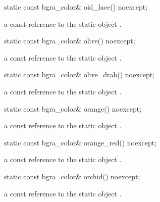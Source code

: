 \begin{itemdecl}
static const bgra_color& old_lace() noexcept;
\end{itemdecl}
\begin{itemdescr}
\pnum
\returns
a const reference to the static  object .
\end{itemdescr}

\begin{itemdecl}
static const bgra_color& olive() noexcept;
\end{itemdecl}
\begin{itemdescr}
\pnum
\returns
a const reference to the static  object .
\end{itemdescr}

\begin{itemdecl}
static const bgra_color& olive_drab() noexcept;
\end{itemdecl}
\begin{itemdescr}
\pnum
\returns
a const reference to the static  object .
\end{itemdescr}

\begin{itemdecl}
static const bgra_color& orange() noexcept;
\end{itemdecl}
\begin{itemdescr}
\pnum
\returns
a const reference to the static  object .
\end{itemdescr}

\begin{itemdecl}
static const bgra_color& orange_red() noexcept;
\end{itemdecl}
\begin{itemdescr}
\pnum
\returns
a const reference to the static  object .
\end{itemdescr}

\begin{itemdecl}
static const bgra_color& orchid() noexcept;
\end{itemdecl}
\begin{itemdescr}
\pnum
\returns
a const reference to the static  object .
\end{itemdescr}

